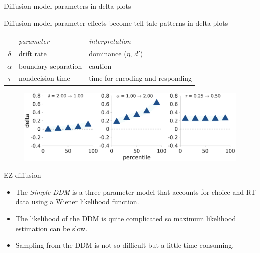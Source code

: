 \documentclass[aspectratio=169]{beamer}
\begin{document}
\begin{frame}[fragile]{Diffusion model parameters in delta plots}

Diffusion model parameter effects become tell-tale patterns in delta plots\\[4ex]

 \centering
\begin{tabular}{cll}
\rowcolor{black}
           & {\it\color{white}parameter} &  {\it\color{white}interpretation} \\
\rowcolor{verylightgray}
$\delta$   &  drift rate              &  dominance ($\eta$, $d'$) \\
\rowcolor{lightgray}
$\alpha$   &  boundary separation     &  caution \\
\rowcolor{verylightgray}
$\tau$     &  nondecision time        &  time for encoding and responding
\end{tabular}

\begin{figure}[htp]
\centering
\vspace{-2ex}
\includegraphics[scale=0.18,bb= 0 0 1552 600,clip]{deltadiff.eps}
\end{figure}

\end{frame}



\begin{frame}{EZ diffusion}
  \begin{itemize}
    \item The \emph{Simple DDM} is a three-parameter model that accounts for choice and RT data using a Wiener likelihood function.\pause
    \item The likelihood of the DDM is quite complicated so maximum likelihood estimation can be slow.\pause
    \item Sampling from the DDM is not so difficult but a little time consuming.
  \end{itemize}
\end{frame}
\end{document}
